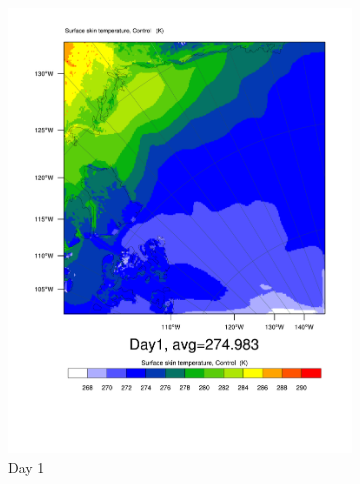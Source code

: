 \begin{figure}
	\begin{subfigure}{0.48\textwidth}
		\centering
		\includegraphics[width=\textwidth]{results/control/skintemp_day1.pdf}
		\caption{Day 1}
		\label{subfig:skin_r1Day1}
	\end{subfigure}
	\begin{subfigure}{0.48\textwidth}
		\centering

\end{subfigure}
\end{figure}
